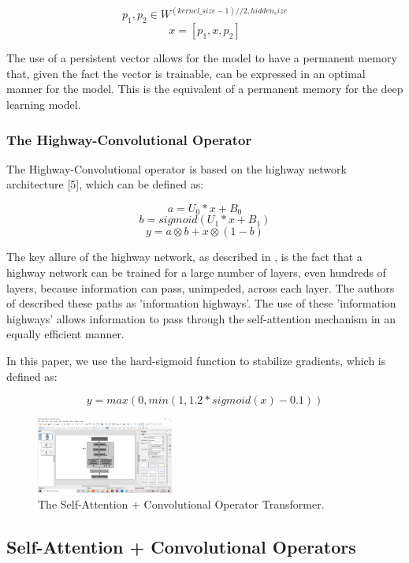 \documentclass{article}
\begin{document}
\[p_1, p_2 \in W^{(kernel\_size - 1)//2, hidden_size} \]
\[x = [p_1, x, p_2] \]

The use of a persistent vector allows for the model to have a permanent memory that, given the fact the vector is trainable, can be expressed in an optimal manner for the model. This is the equivalent of a permanent memory for the deep learning model.

\subsubsection{The Highway-Convolutional Operator}

The Highway-Convolutional operator is based on the highway network architecture [5], which can be defined as:

\[a = U_0 * x + B_0 \]
\[b = sigmoid(U_1 * x + B_1) \]
\[y = a \otimes b + x \otimes (1 - b) \]

The key allure of the highway network, as described in \cite{srivastava2015}, is the fact that a highway network can be trained for a large number of layers, even hundreds of layers, because information can pass, unimpeded, across each layer. The authors of \cite{srivastava2015} described these paths as 'information highways'. The use of these 'information highways' allows information to pass through the self-attention mechanism in an equally efficient manner.

In this paper, we use the hard-sigmoid function \cite{kaiser2016} to stabilize gradients, which is defined as: 

\[ y = max(0, min(1, 1.2 * sigmoid(x) - 0.1)) \]

\begin{figure}
\begin{center}
\vspace{-12pt}
\includegraphics[clip,trim={10.5cm 3.72cm 14cm 4.8cm},width=0.4\textwidth]{transformer-act.png}
 \caption{The Self-Attention + Convolutional Operator Transformer.}
\end{center}
\vspace{-6pt}
\end{figure}

\subsection{Self-Attention + Convolutional Operators}
\end{document}
